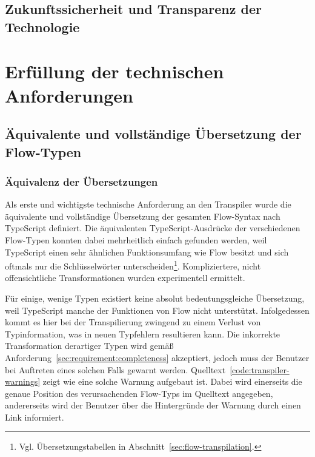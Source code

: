 \subsection{Zukunftssicherheit und Transparenz der Technologie}



\pagebreak %
\section{Erfüllung der technischen Anforderungen}

\subsection{Äquivalente und vollständige Übersetzung der Flow-Typen}
\label{sec:interpretation:equivalent-translation}

\subsubsection{Äquivalenz der Übersetzungen}

Als erste und wichtigste technische Anforderung an den Transpiler wurde die äquivalente und vollständige Übersetzung der gesamten Flow-Syntax nach TypeScript definiert. Die äquivalenten TypeScript-Ausdrücke der verschiedenen Flow-Typen konnten dabei mehrheitlich einfach gefunden werden, weil TypeScript einen sehr ähnlichen Funktionsumfang wie Flow besitzt und sich oftmals nur die Schlüsselwörter unterscheiden\footnote{Vgl. Übersetzungstabellen in Abschnitt~\ref{sec:flow-transpilation}.}. Kompliziertere, nicht offensichtliche Transformationen wurden experimentell ermittelt.

Für einige, wenige Typen existiert keine absolut bedeutungsgleiche Übersetzung, weil TypeScript manche der Funktionen von Flow nicht unterstützt. Infolgedessen kommt es hier bei der Transpilierung zwingend zu einem Verlust von Typinformation, was in neuen Typfehlern resultieren kann. Die inkorrekte Transformation derartiger Typen wird gemäß Anforderung~\ref{sec:requirement:completeness} akzeptiert, jedoch muss der Benutzer bei Auftreten eines solchen Falls gewarnt werden. Quelltext~\ref{code:transpiler-warnings} zeigt wie eine solche Warnung aufgebaut ist. Dabei wird einerseits die genaue Position des verursachenden Flow-Typs im Quelltext angegeben, andererseits wird der Benutzer über die Hintergründe der Warnung durch einen Link informiert.

